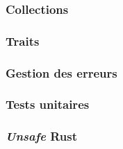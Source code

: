 \subsubsection{Collections}

\subsubsection{Traits}

\subsubsection{Gestion des erreurs}

\subsubsection{Tests unitaires}

\subsubsection{\textit{Unsafe} Rust}

